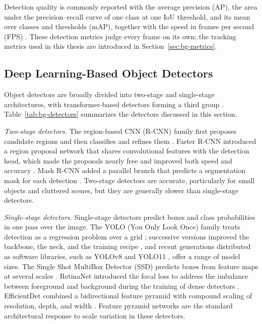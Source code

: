 Detection quality is commonly reported with the average precision (AP), the area under the precision--recall curve of one class at one IoU threshold, and its mean over classes and thresholds (mAP), together with the speed in frames per second (FPS) \cite{lin2014coco,ismail2026realtime}. These detection metrics judge every frame on its own; the tracking metrics used in this thesis are introduced in Section~\ref{sec:bg-metrics}.

\subsection{Deep Learning-Based Object Detectors}\label{sec:bg-detectors}
Object detectors are broadly divided into two-stage and single-stage architectures, with transformer-based detectors forming a third group \cite{ismail2026realtime}. Table~\ref{tab:bg-detectors} summarizes the detectors discussed in this section.

\emph{Two-stage detectors.} The region-based CNN (R-CNN) family first proposes candidate regions and then classifies and refines them \cite{girshick2014rcnn}. Faster R-CNN introduced a region proposal network that shares convolutional features with the detection head, which made the proposals nearly free and improved both speed and accuracy \cite{ren2017fasterrcnn}. Mask R-CNN added a parallel branch that predicts a segmentation mask for each detection \cite{he2017maskrcnn}. Two-stage detectors are accurate, particularly for small objects and cluttered scenes, but they are generally slower than single-stage detectors.

\emph{Single-stage detectors.} Single-stage detectors predict boxes and class probabilities in one pass over the image. The YOLO (You Only Look Once) family treats detection as a regression problem over a grid \cite{redmon2016yolo}; successive versions improved the backbone, the neck, and the training recipe \cite{redmon2018yolov3,bochkovskiy2020yolov4,ge2021yolox,wang2024yolov9}, and recent generations distributed as software libraries, such as YOLOv8 \cite{jocher2023yolov8} and YOLO11 \cite{jocher2024yolo11}, offer a range of model sizes. The Single Shot MultiBox Detector (SSD) predicts boxes from feature maps at several scales \cite{liu2016ssd}. RetinaNet introduced the focal loss to address the imbalance between foreground and background during the training of dense detectors \cite{lin2017focal}. EfficientDet combined a bidirectional feature pyramid with compound scaling of resolution, depth, and width \cite{tan2020efficientdet}. Feature pyramid networks \cite{lin2017fpn} are the standard architectural response to scale variation in these detectors.

